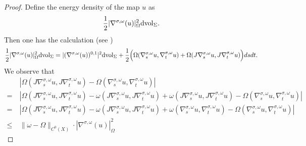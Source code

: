 \documentclass[reqno, 10pt]{amsart}
\numberwithin{equation}{section}
\numberwithin{equation}{section}
\theoremstyle{definition}
\theoremstyle{remark}
\newcommand{\beq}{\begin{equation}}
\newcommand{\eeq}{\end{equation}}
\newcommand{\beqn}{\begin{equation*}}
\newcommand{\eeqn}{\end{equation*}}
\begin{document}
\begin{proof}
Define the energy density of the map $u$ as
\beqn
\frac{1}{2} | \nabla^{\sigma, \omega} (u)|_\Omega^2 {\rm dvol}_\Sigma.
\eeqn
Then one has the calculation (see \cite[Lemma 2.2.1]{McDuff_Salamon_2004})
\beqn
\frac{1}{2} | \nabla^{\sigma, \omega} (u)|_\Omega^2 {\rm dvol}_\Sigma = | (\nabla^{\sigma, \omega} (u))^{0,1}|^2 {\rm dvol}_\Sigma + \frac{1}{2} \Big( \Omega(\nabla_s^{\sigma, \omega} u, \nabla_t^{\sigma, \omega} u) + \Omega( J \nabla_s^{\sigma, \omega} u, J \nabla_t^{\sigma, \omega}u)  \Big) ds dt.
\eeqn
We observe that
\beq\label{eqn:trivial}
\begin{split}
&\ |\Omega( J \nabla_s^{\sigma, \omega} u, J \nabla_t^{\sigma, \omega}u) - \Omega(\nabla_s^{\sigma, \omega} u, \nabla_t^{\sigma, \omega} u)| \\
= &\ |\Omega( J \nabla_s^{\sigma, \omega} u, J \nabla_t^{\sigma, \omega}u) - \omega( J \nabla_s^{\sigma, \omega} u, J \nabla_t^{\sigma, \omega}u) + \omega( J \nabla_s^{\sigma, \omega} u, J \nabla_t^{\sigma, \omega}u) - \Omega(\nabla_s^{\sigma, \omega} u, \nabla_t^{\sigma, \omega} u)| \\
= &\ |\Omega( J \nabla_s^{\sigma, \omega} u, J \nabla_t^{\sigma, \omega}u) - \omega( J \nabla_s^{\sigma, \omega} u, J \nabla_t^{\sigma, \omega}u) + \omega( \nabla_s^{\sigma, \omega} u, \nabla_t^{\sigma, \omega}u) - \Omega(\nabla_s^{\sigma, \omega} u, \nabla_t^{\sigma, \omega} u)| \\
\leq &\ \| \omega - \Omega \|_{C^0(X)} \cdot | \nabla^{\sigma, \omega} (u)|_\Omega^2
\end{split}
\eeq


\end{proof}
\end{document}
